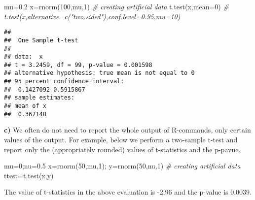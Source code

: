 \documentclass[
  11pt,
]{article}
\newenvironment{Shaded}{\begin{snugshade}}{\end{snugshade}}
\newcommand{\AttributeTok}[1]{\textcolor[rgb]{0.77,0.63,0.00}{#1}}
\newcommand{\CommentTok}[1]{\textcolor[rgb]{0.56,0.35,0.01}{\textit{#1}}}
\newcommand{\DecValTok}[1]{\textcolor[rgb]{0.00,0.00,0.81}{#1}}
\newcommand{\FloatTok}[1]{\textcolor[rgb]{0.00,0.00,0.81}{#1}}
\newcommand{\FunctionTok}[1]{\textcolor[rgb]{0.00,0.00,0.00}{#1}}
\newcommand{\NormalTok}[1]{#1}
\newcommand{\OtherTok}[1]{\textcolor[rgb]{0.56,0.35,0.01}{#1}}
\begin{document}
\begin{Shaded}
\begin{Highlighting}[]
\NormalTok{mu}\OtherTok{=}\FloatTok{0.2}
\NormalTok{x}\OtherTok{=}\FunctionTok{rnorm}\NormalTok{(}\DecValTok{100}\NormalTok{,mu,}\DecValTok{1}\NormalTok{) }\CommentTok{\# creating artificial data}
\FunctionTok{t.test}\NormalTok{(x,}\AttributeTok{mean=}\DecValTok{0}\NormalTok{)   }\CommentTok{\# t.test(x,alternative=c("two.sided"),conf.level=0.95,mu=10)}
\end{Highlighting}
\end{Shaded}

\begin{verbatim}
## 
##  One Sample t-test
## 
## data:  x
## t = 3.2459, df = 99, p-value = 0.001598
## alternative hypothesis: true mean is not equal to 0
## 95 percent confidence interval:
##  0.1427092 0.5915867
## sample estimates:
## mean of x 
##  0.367148
\end{verbatim}

\textbf{c)} We often do not need to report the whole output of
R-commands, only certain values of the output. For example, below we
perform a two-sample t-test and report only the (appropriately rounded)
values of t-statistics and the p-pavue.

\begin{Shaded}
\begin{Highlighting}[]
\NormalTok{mu}\OtherTok{=}\DecValTok{0}\NormalTok{;nu}\OtherTok{=}\FloatTok{0.5}
\NormalTok{x}\OtherTok{=}\FunctionTok{rnorm}\NormalTok{(}\DecValTok{50}\NormalTok{,mu,}\DecValTok{1}\NormalTok{); y}\OtherTok{=}\FunctionTok{rnorm}\NormalTok{(}\DecValTok{50}\NormalTok{,nu,}\DecValTok{1}\NormalTok{) }\CommentTok{\# creating artificial data}
\NormalTok{ttest}\OtherTok{=}\FunctionTok{t.test}\NormalTok{(x,y) }
\end{Highlighting}
\end{Shaded}

The value of t-statistics in the above evaluation is -2.96 and the
p-value is 0.0039.
\end{document}
